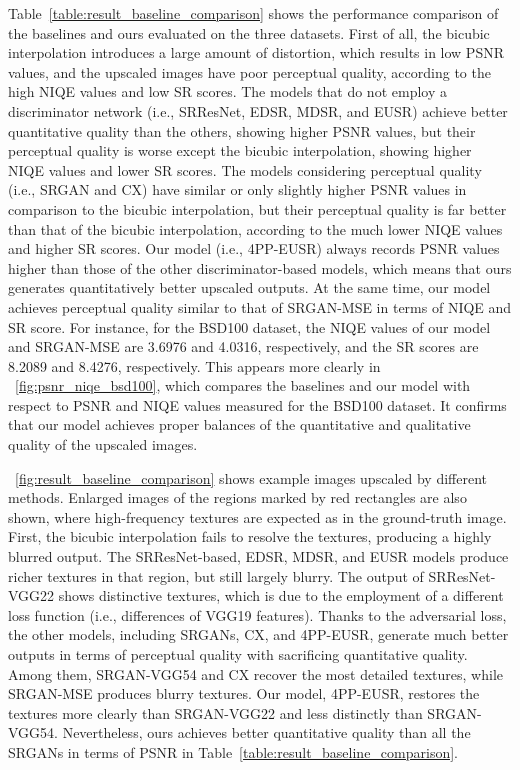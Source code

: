 \documentclass[runningheads]{llncs}
\begin{document}
Table~\ref{table:result_baseline_comparison} shows the performance comparison of the baselines and ours evaluated on the three datasets.
First of all, the bicubic interpolation introduces a large amount of distortion, which results in low PSNR values, and the upscaled images have poor perceptual quality, according to the high NIQE values and low SR scores. 
The models that do not employ a discriminator network (i.e., SRResNet, EDSR, MDSR, and EUSR) achieve better quantitative quality than the others, showing higher PSNR values, but their perceptual quality is worse except the bicubic interpolation, showing higher NIQE values and lower SR scores.
The models considering perceptual quality (i.e., SRGAN and CX) have similar or only slightly higher PSNR values in comparison to the bicubic interpolation, but their perceptual quality is far better than that of the bicubic interpolation, according to the much lower NIQE values and higher SR scores.
Our model (i.e., 4PP-EUSR) always records PSNR values higher than those of the other discriminator-based models, which means that ours generates quantitatively better upscaled outputs.
At the same time, our model achieves perceptual quality similar to that of SRGAN-MSE in terms of NIQE and SR score.
For instance, for the BSD100 dataset, the NIQE values of our model and SRGAN-MSE are 3.6976 and 4.0316, respectively, and the SR scores are 8.2089 and 8.4276, respectively.
This appears more clearly in \figurename~\ref{fig:psnr_niqe_bsd100}, which compares the baselines and our model with respect to PSNR and NIQE values measured for the BSD100 dataset.
It confirms that our model achieves proper balances of the quantitative and qualitative quality of the upscaled images.

\figurename~\ref{fig:result_baseline_comparison} shows example images upscaled by different methods.
Enlarged images of the regions marked by red rectangles are also shown, where high-frequency textures are expected as in the ground-truth image.
First, the bicubic interpolation fails to resolve the textures, producing a highly blurred output.
The SRResNet-based, EDSR, MDSR, and EUSR models produce richer textures in that region, but still largely blurry.
The output of SRResNet-VGG22 shows distinctive textures, which is due to the employment of a different loss function (i.e., differences of VGG19 features).
Thanks to the adversarial loss, the other models, including SRGANs, CX, and 4PP-EUSR, generate much better outputs in terms of perceptual quality with sacrificing quantitative quality.
Among them, SRGAN-VGG54 and CX recover the most detailed textures, while SRGAN-MSE produces blurry textures.
Our model, 4PP-EUSR, restores the textures more clearly than SRGAN-VGG22 and less distinctly than SRGAN-VGG54.
Nevertheless, ours achieves better quantitative quality than all the SRGANs in terms of PSNR in Table~\ref{table:result_baseline_comparison}.
\end{document}
